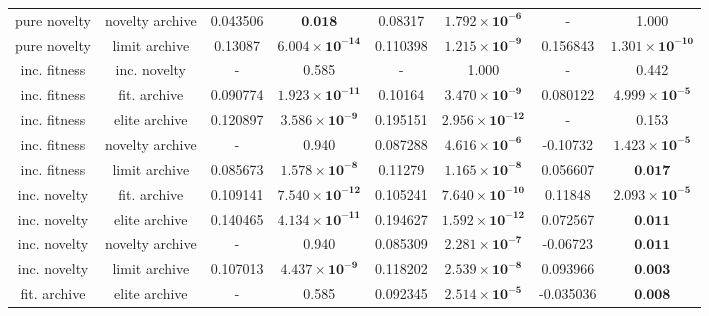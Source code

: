 \begin{tabular}{cccccccc}
   pure novelty & novelty archive &       0.043506 &                 $\textbf{0.018}$ &     0.08317 &  $\mathbf{1.792 \times 10^{-6}}$ &           - &                            1.000 \\
   pure novelty &   limit archive &        0.13087 & $\mathbf{6.004 \times 10^{-14}}$ &    0.110398 &  $\mathbf{1.215 \times 10^{-9}}$ &    0.156843 & $\mathbf{1.301 \times 10^{-10}}$ \\
   inc. fitness &    inc. novelty &              - &                            0.585 &           - &                            1.000 &           - &                            0.442 \\
   inc. fitness &    fit. archive &       0.090774 & $\mathbf{1.923 \times 10^{-11}}$ &     0.10164 &  $\mathbf{3.470 \times 10^{-9}}$ &    0.080122 &  $\mathbf{4.999 \times 10^{-5}}$ \\
   inc. fitness &   elite archive &       0.120897 &  $\mathbf{3.586 \times 10^{-9}}$ &    0.195151 & $\mathbf{2.956 \times 10^{-12}}$ &           - &                            0.153 \\
   inc. fitness & novelty archive &              - &                            0.940 &    0.087288 &  $\mathbf{4.616 \times 10^{-6}}$ &    -0.10732 &  $\mathbf{1.423 \times 10^{-5}}$ \\
   inc. fitness &   limit archive &       0.085673 &  $\mathbf{1.578 \times 10^{-8}}$ &     0.11279 &  $\mathbf{1.165 \times 10^{-8}}$ &    0.056607 &                 $\textbf{0.017}$ \\
   inc. novelty &    fit. archive &       0.109141 & $\mathbf{7.540 \times 10^{-12}}$ &    0.105241 & $\mathbf{7.640 \times 10^{-10}}$ &     0.11848 &  $\mathbf{2.093 \times 10^{-5}}$ \\
   inc. novelty &   elite archive &       0.140465 & $\mathbf{4.134 \times 10^{-11}}$ &    0.194627 & $\mathbf{1.592 \times 10^{-12}}$ &    0.072567 &                 $\textbf{0.011}$ \\
   inc. novelty & novelty archive &              - &                            0.940 &    0.085309 &  $\mathbf{2.281 \times 10^{-7}}$ &    -0.06723 &                 $\textbf{0.011}$ \\
   inc. novelty &   limit archive &       0.107013 &  $\mathbf{4.437 \times 10^{-9}}$ &    0.118202 &  $\mathbf{2.539 \times 10^{-8}}$ &    0.093966 &                 $\textbf{0.003}$ \\
   fit. archive &   elite archive &              - &                            0.585 &    0.092345 &  $\mathbf{2.514 \times 10^{-5}}$ &   -0.035036 &                 $\textbf{0.008}$ \\

\end{tabular}
